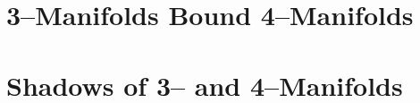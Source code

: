 \label{cha:background}

\section{3--Manifolds Bound 4--Manifolds}


\section{Shadows of 3-- and 4--Manifolds}


%
